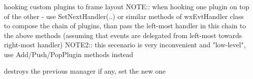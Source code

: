 
hooking custom plugins to frame layout
NOTE:: when hooking one plugin on top of the other -
use SetNextHandler(..) or similar methods
of wxEvtHandler class to compose the chain of plugins,
than pass the left-most handler in this chain to
the above methods (assuming that events are delegated
from left-most towards right-most handler)
NOTE2:: this secenario is very inconvenient and "low-level",
use Add/Push/PopPlugin methods instead


\label{wxframelayoutsetupdatesmanager}


destroys the previous manager if any, set the new one


\label{wxframelayoutshowfloatedwindows}



\label{wxframelayoutunhookfromframe}


